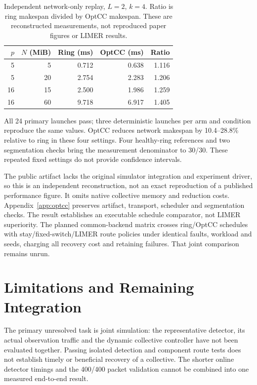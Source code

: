 \documentclass[sigconf]{acmart}
\begin{document}
\begin{table}[t]
  \caption{Independent network-only replay, $L=2$, $k=4$. Ratio is ring
  makespan divided by OptCC makespan. These are reconstructed measurements,
  not reproduced paper figures or LIMER results.}
  \label{tab:optcc-replay}
  \centering
  \small
  \begin{tabular}{@{}rrrrr@{}}
    \toprule
    $p$ & $N$ (MiB) & Ring (ms) & OptCC (ms) & Ratio \\
    \midrule
    5 & 5 & 0.712 & 0.638 & 1.116 \\
    5 & 20 & 2.754 & 2.283 & 1.206 \\
    16 & 15 & 2.500 & 1.986 & 1.259 \\
    16 & 60 & 9.718 & 6.917 & 1.405 \\
    \bottomrule
  \end{tabular}
\end{table}

All 24 primary launches pass; three deterministic launches per arm and
condition reproduce the same values. OptCC reduces network makespan by
10.4--28.8\% relative to ring in these four settings. Four healthy-ring
references and two segmentation checks bring the measurement denominator
to 30/30. These repeated fixed settings do not provide confidence intervals.

The public artifact lacks the original simulator integration and experiment
driver, so this is an independent reconstruction, not an exact reproduction
of a published performance figure. It omits native collective memory and
reduction costs. Appendix~\ref{app:optcc} preserves artifact, transport,
scheduler and segmentation checks. The result establishes an executable
schedule comparator, not LIMER superiority. The planned common-backend
matrix crosses ring/OptCC schedules with stay/fixed-switch/LIMER route
policies under identical faults, workload and seeds, charging all recovery
cost and retaining failures. That joint comparison remains unrun.

\section{Limitations and Remaining Integration}
\label{sec:limitations}
The primary unresolved task is joint simulation: the representative
detector, its actual observation traffic and the dynamic collective
controller have not been evaluated together. Passing isolated detection
and component route tests does not establish timely or beneficial recovery
of a collective. The shorter online detector timings and the 400/400 packet
validation cannot be combined into one measured end-to-end result.
\end{document}
